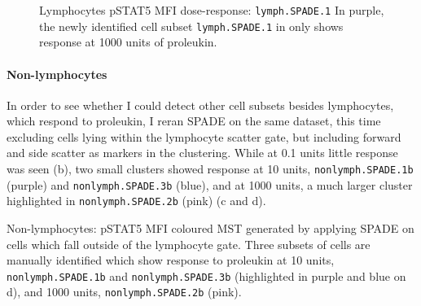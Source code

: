 \begin{figure}
\begin{minipage}{.5\textwidth}
\end{minipage}
\begin{minipage}{.3\textwidth}
{ Lymphocytes pSTAT5 MFI dose-response: \texttt{lymph.SPADE.1} }
{
In purple, the newly identified cell subset \texttt{lymph.SPADE.1} in  only shows response at 1000 units of proleukin. 
}
\end{minipage}
\end{figure}

\clearpage

\paragraph{Non-lymphocytes}

In order to see whether I could detect other cell subsets besides lymphocytes, which respond to proleukin, I reran \gls{SPADE} on the same dataset, this time excluding cells lying within the lymphocyte scatter gate, but including forward and side scatter as markers in the clustering.
While at 0.1 units little response was seen (b), two small clusters showed response at 10 units, \texttt{nonlymph.SPADE.1b} (purple) and \texttt{nonlymph.SPADE.3b} (blue), and at 1000 units, a much larger cluster highlighted in \texttt{nonlymph.SPADE.2b} (pink) (c and d).

{Non-lymphocytes: pSTAT5 MFI coloured \gls{MST} generated by applying \gls{SPADE} on cells which fall outside of the lymphocyte gate.}
{
  Three subsets of cells are manually identified which show response to proleukin at 10 units, \texttt{nonlymph.SPADE.1b} and \texttt{nonlymph.SPADE.3b} (highlighted in purple and blue on d), and 1000 units, \texttt{nonlymph.SPADE.2b} (pink).
}
% 

